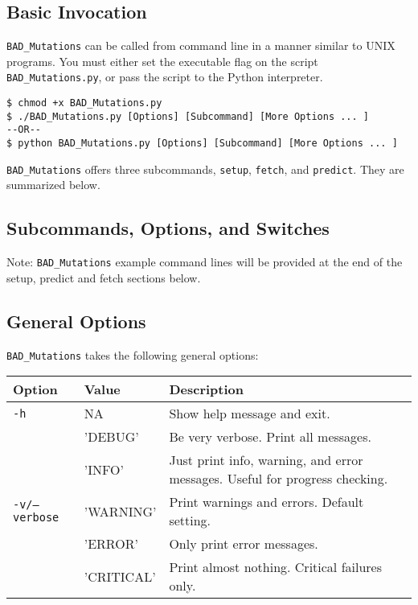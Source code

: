 \documentclass[12pt]{article}
\newcommand{\BM}{\texttt{BAD\_Mutations} }
\begin{document}
\subsection*{Basic Invocation}
\par \BM can be called from command line in a manner similar to UNIX programs.
You must either set the executable flag on the script \texttt{BAD\_Mutations.py},
or pass the script to the Python interpreter.
\begin{Verbatim}[frame=single, fontsize=\small, rulecolor=\color{gray}]
$ chmod +x BAD_Mutations.py
$ ./BAD_Mutations.py [Options] [Subcommand] [More Options ... ]
--OR--
$ python BAD_Mutations.py [Options] [Subcommand] [More Options ... ]
\end{Verbatim}
\par \BM offers three subcommands, \texttt{setup}, \texttt{fetch}, and
\texttt{predict}. They are summarized below.

\subsection*{Subcommands, Options, and Switches}
\par Note: \BM example command lines will be provided at the end of the setup, predict and fetch sections below. 
\subsection*{General Options}
\par \BM takes the following general options:
\begin{table}[h]
    \centering
    \begin{tabular}{p{105pt} l p{260pt}}
    \toprule
    Option & Value & Description \\
    \midrule
    \texttt{-h} & NA & Show help message and exit. \\
    \midrule
    & 'DEBUG' & Be very verbose. Print all messages.\\ \cmidrule{2-3}
    & 'INFO' & Just print info, warning, and error messages. Useful for progress checking.\\ \cmidrule{2-3}
    \texttt{-v/--verbose} & 'WARNING' & Print warnings and errors. Default setting. \\ \cmidrule{2-3}
    & 'ERROR' & Only print error messages. \\ \cmidrule{2-3}
    & 'CRITICAL' & Print almost nothing. Critical failures only. \\
    \bottomrule
    \end{tabular}
\end{table}
\end{document}
